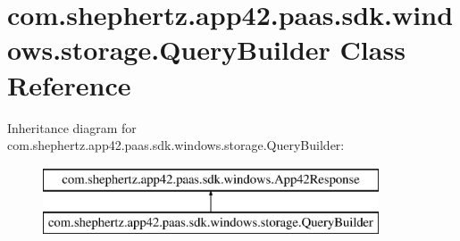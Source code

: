 \hypertarget{classcom_1_1shephertz_1_1app42_1_1paas_1_1sdk_1_1windows_1_1storage_1_1_query_builder}{\section{com.\+shephertz.\+app42.\+paas.\+sdk.\+windows.\+storage.\+Query\+Builder Class Reference}
\label{classcom_1_1shephertz_1_1app42_1_1paas_1_1sdk_1_1windows_1_1storage_1_1_query_builder}
}
Inheritance diagram for com.\+shephertz.\+app42.\+paas.\+sdk.\+windows.\+storage.\+Query\+Builder\+:\begin{figure}[H]
\begin{center}
\leavevmode
\includegraphics[height=2.000000cm]{classcom_1_1shephertz_1_1app42_1_1paas_1_1sdk_1_1windows_1_1storage_1_1_query_builder}
\end{center}
\end{figure}
